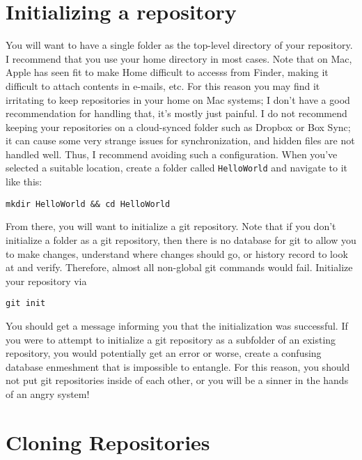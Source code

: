 \section{Initializing a repository}
\par{
You will want to have a single folder as the top-level directory of your
repository. I recommend that you use your home directory in most cases. Note
that on Mac, Apple has seen fit to make Home difficult to accesss from Finder,
making it difficult to attach contents in e-mails, etc. For this reason you
may find it irritating to keep repositories in your home on Mac systems; I
don't have a good recommendation for handling that, it's mostly just painful. 
I do not recommend keeping your repositories on a cloud-synced folder such as
Dropbox or Box Sync; it can cause some very strange issues for
synchronization, and hidden files are not handled well. Thus, I recommend
avoiding such a configuration. When you've selected a suitable location,
create a folder called \verb+HelloWorld+ and navigate to it like this:
}

\begin{verbatim}
mkdir HelloWorld && cd HelloWorld
\end{verbatim}

\par{
From there, you will want to initialize a git repository. Note that if you
don't initialize a folder as a git repository, then there is no database for
git to allow you to make changes, understand where changes should go, or
history record to look at and verify. Therefore, almost all non-global git
commands would fail. Initialize your repository via
}

\begin{verbatim}
git init
\end{verbatim}

\par{
You should get a message informing you that the initialization was successful.
If you were to attempt to initialize a git repository as a subfolder of an
existing repository, you would potentially get an error or worse, create a
confusing database enmeshment that is impossible to entangle. For this reason,
you should not put git repositories inside of each other, or you will be a
sinner in the hands of an angry system!
}

\section{Cloning Repositories}

